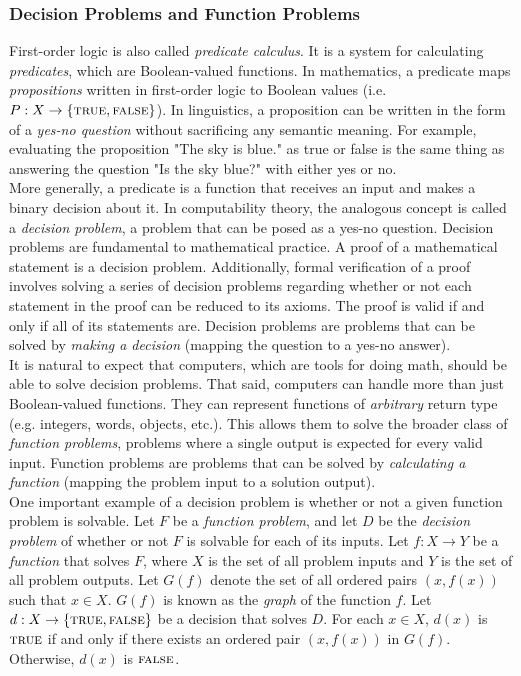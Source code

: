\subsubsection{Decision Problems and Function Problems}

First-order logic is also called \textit{predicate calculus}. It is a system for calculating \textit{predicates}, which are Boolean-valued functions. In mathematics, a predicate maps \textit{propositions} written in first-order logic to Boolean values (i.e. $P:X\rightarrow \{\textsc{true},\textsc{false}\}$). In linguistics, a proposition can be written in the form of a \textit{yes-no question} without sacrificing any semantic meaning. For example, evaluating the proposition "The sky is blue." as true or false is the same thing as answering the question "Is the sky blue?" with either yes or no. \\

More generally, a predicate is a function that receives an input and makes a binary decision about it. In computability theory, the analogous concept is called a \textit{decision problem}, a problem that can be posed as a yes-no question. Decision problems are fundamental to mathematical practice. A proof of a mathematical statement is a decision problem. Additionally, formal verification of a proof involves solving a series of decision problems regarding whether or not each statement in the proof can be reduced to its axioms. The proof is valid if and only if all of its statements are. Decision problems are problems that can be solved by \textit{making a decision} (mapping the question to a yes-no answer).  \\

It is natural to expect that computers, which are tools for doing math, should be able to solve decision problems. That said, computers can handle more than just Boolean-valued functions. They can represent functions of \textit{arbitrary} return type (e.g. integers, words, objects, etc.). This allows them to solve the broader class of \textit{function problems}, problems where a single output is expected for every valid input. Function problems are problems that can be solved by \textit{calculating a function} (mapping the problem input to a solution output). \\

One important example of a decision problem is whether or not a given function problem is solvable. Let $F$ be a \textit{function problem}, and let $D$ be the \textit{decision problem} of whether or not $F$ is solvable for each of its inputs. Let $f:X\rightarrow Y$ be a \textit{function} that solves $F$, where $X$ is the set of all problem inputs and $Y$ is the set of all problem outputs. Let $G(f)$ denote the set of all ordered pairs $(x,f(x))$ such that $x\in X$. $G(f)$ is known as the \textit{graph} of the function $f$. Let $d:X\rightarrow \{\textsc{true},\textsc{false}\}$ be a decision that solves $D$. For each $x\in X$, $d(x)$ is $\textsc{true}$ if and only if there exists an ordered pair $(x,f(x))$ in $G(f)$. Otherwise, $d(x)$ is $\textsc{false}$. \\

